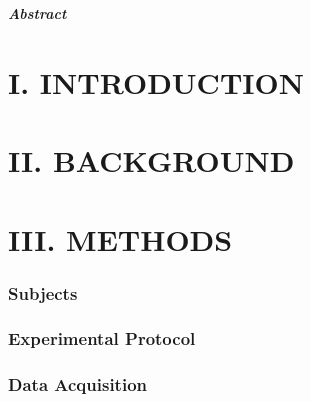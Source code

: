 \begin{multicols}{2}
	
	
	\textbf{\textit{Abstract} 
		}
	
	
	\section*{I. INTRODUCTION}%
	
	
	
	\section*{II. BACKGROUND}%
	
	 
	
	\section*{III. METHODS}%
	
	\subsubsection*{Subjects}
	
	
	
	\subsubsection*{Experimental Protocol}
	
	
	
	\subsubsection*{Data Acquisition}
	
	
%	
	

\end{multicols}
